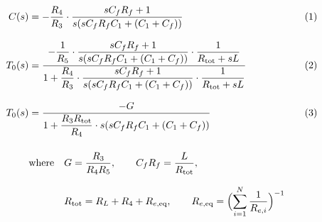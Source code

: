\documentclass[border=3pt]{standalone}
\newcommand{\Rt}{R_{\mathrm{tot}}}
\newcommand{\Kc}{\dfrac{R_4}{R_3}}
\newcommand{\Hc}{\dfrac{sC_fR_f+1}{s(sC_fR_fC_1+(C_1+C_f))}}
\newcommand{\Hp}{\dfrac{1}{\Rt+sL}}
\begin{document}
$\displaystyle
\begin{alignedat}{2}
C(s)   &= -\Kc\cdot\Hc                                            &\qquad& (1) \\[8pt]
T_0(s) &= \dfrac{-\dfrac{1}{R_5}\cdot\Hc\cdot\Hp}
                {1+\Kc\cdot\Hc\cdot\Hp}                           &\qquad& (2) \\[8pt]
T_0(s) &= \dfrac{-G}
                {1+\dfrac{R_3\Rt}{R_4}\cdot s(sC_fR_fC_1+(C_1+C_f))} &\qquad& (3) \\[12pt]
       &\text{where}\quad G=\dfrac{R_3}{R_4R_5},\qquad
        C_fR_f=\dfrac{L}{\Rt},                                    && \\[8pt]
       &\hphantom{\text{where}\quad}\Rt=R_L+R_4+R_{e,\mathrm{eq}},\qquad
        R_{e,\mathrm{eq}}=\Bigl(\sum_{i=1}^{N}\dfrac{1}{R_{e,i}}\Bigr)^{-1} &&
\end{alignedat}$
\end{document}
